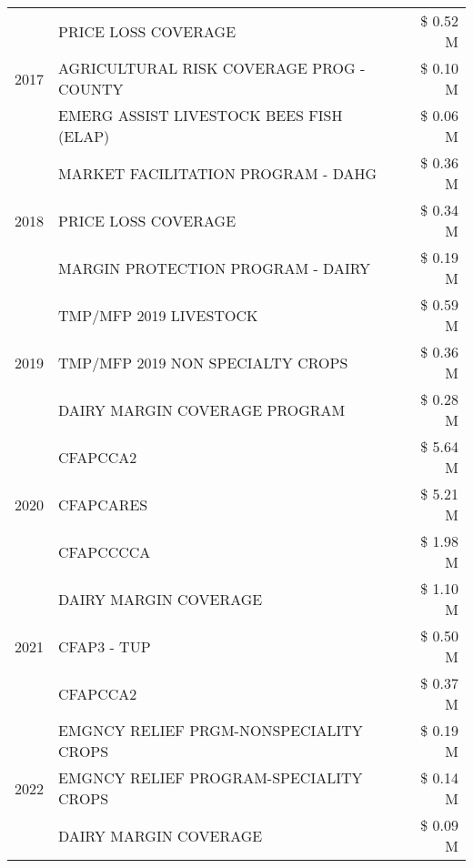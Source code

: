 \begin{tabular}{llr}
\cline{1-3}
\multirow[t]{3}{*}{2017} & PRICE LOSS COVERAGE & \$ 0.52 M \\
 & AGRICULTURAL RISK COVERAGE PROG - COUNTY & \$ 0.10 M \\
 & EMERG ASSIST LIVESTOCK BEES FISH (ELAP) & \$ 0.06 M \\
\cline{1-3}
\multirow[t]{3}{*}{2018} & MARKET FACILITATION PROGRAM - DAHG & \$ 0.36 M \\
 & PRICE LOSS COVERAGE & \$ 0.34 M \\
 & MARGIN PROTECTION PROGRAM - DAIRY & \$ 0.19 M \\
\cline{1-3}
\multirow[t]{3}{*}{2019} & TMP/MFP 2019 LIVESTOCK & \$ 0.59 M \\
 & TMP/MFP 2019 NON SPECIALTY CROPS & \$ 0.36 M \\
 & DAIRY MARGIN COVERAGE PROGRAM & \$ 0.28 M \\
\cline{1-3}
\multirow[t]{3}{*}{2020} & CFAPCCA2 & \$ 5.64 M \\
 & CFAPCARES & \$ 5.21 M \\
 & CFAPCCCCA & \$ 1.98 M \\
\cline{1-3}
\multirow[t]{3}{*}{2021} & DAIRY MARGIN COVERAGE & \$ 1.10 M \\
 & CFAP3 - TUP & \$ 0.50 M \\
 & CFAPCCA2 & \$ 0.37 M \\
\cline{1-3}
\multirow[t]{3}{*}{2022} & EMGNCY RELIEF PRGM-NONSPECIALITY CROPS & \$ 0.19 M \\
 & EMGNCY RELIEF PROGRAM-SPECIALITY CROPS & \$ 0.14 M \\
 & DAIRY MARGIN COVERAGE & \$ 0.09 M \\
\cline{1-3}
\bottomrule
\end{tabular}
